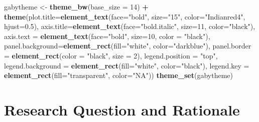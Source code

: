 \documentclass[12pt,]{article}
\newenvironment{Shaded}{\begin{snugshade}}{\end{snugshade}}
\newcommand{\KeywordTok}[1]{\textcolor[rgb]{0.13,0.29,0.53}{\textbf{#1}}}
\newcommand{\DataTypeTok}[1]{\textcolor[rgb]{0.13,0.29,0.53}{#1}}
\newcommand{\DecValTok}[1]{\textcolor[rgb]{0.00,0.00,0.81}{#1}}
\newcommand{\FloatTok}[1]{\textcolor[rgb]{0.00,0.00,0.81}{#1}}
\newcommand{\StringTok}[1]{\textcolor[rgb]{0.31,0.60,0.02}{#1}}
\newcommand{\OperatorTok}[1]{\textcolor[rgb]{0.81,0.36,0.00}{\textbf{#1}}}
\newcommand{\NormalTok}[1]{#1}
\begin{document}
\begin{Shaded}
\begin{Highlighting}[]
\NormalTok{gabytheme <-}\StringTok{ }\KeywordTok{theme_bw}\NormalTok{(}\DataTypeTok{base_size =} \DecValTok{14}\NormalTok{) }\OperatorTok{+}\StringTok{ }
\StringTok{  }\KeywordTok{theme}\NormalTok{(}\DataTypeTok{plot.title=}\KeywordTok{element_text}\NormalTok{(}\DataTypeTok{face=}\StringTok{"bold"}\NormalTok{, }\DataTypeTok{size=}\StringTok{"15"}\NormalTok{, }\DataTypeTok{color=}\StringTok{"Indianred4"}\NormalTok{, }\DataTypeTok{hjust=}\FloatTok{0.5}\NormalTok{),}
        \DataTypeTok{axis.title=}\KeywordTok{element_text}\NormalTok{(}\DataTypeTok{face=}\StringTok{"bold.italic"}\NormalTok{, }\DataTypeTok{size=}\DecValTok{11}\NormalTok{, }\DataTypeTok{color=}\StringTok{"black"}\NormalTok{),}
\DataTypeTok{axis.text =} \KeywordTok{element_text}\NormalTok{(}\DataTypeTok{face=}\StringTok{"bold"}\NormalTok{, }\DataTypeTok{size=}\DecValTok{10}\NormalTok{, }\DataTypeTok{color =} \StringTok{"black"}\NormalTok{), }
\DataTypeTok{panel.background=}\KeywordTok{element_rect}\NormalTok{(}\DataTypeTok{fill=}\StringTok{"white"}\NormalTok{, }\DataTypeTok{color=}\StringTok{"darkblue"}\NormalTok{), }
\DataTypeTok{panel.border =} \KeywordTok{element_rect}\NormalTok{(}\DataTypeTok{color =} \StringTok{"black"}\NormalTok{, }\DataTypeTok{size =} \DecValTok{2}\NormalTok{),}
\DataTypeTok{legend.position =} \StringTok{"top"}\NormalTok{, }\DataTypeTok{legend.background =} \KeywordTok{element_rect}\NormalTok{(}\DataTypeTok{fill=}\StringTok{"white"}\NormalTok{, }\DataTypeTok{color=}\StringTok{"black"}\NormalTok{),}
            \DataTypeTok{legend.key =} \KeywordTok{element_rect}\NormalTok{(}\DataTypeTok{fill=}\StringTok{"transparent"}\NormalTok{, }\DataTypeTok{color=}\StringTok{"NA"}\NormalTok{))}
\KeywordTok{theme_set}\NormalTok{(gabytheme)}
\end{Highlighting}
\end{Shaded}

\section{Research Question and
Rationale}\label{research-question-and-rationale-1}
\end{document}
